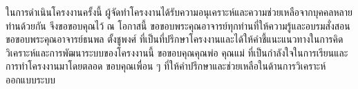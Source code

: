 
ในการดำเนินโครงงานครั้งนี้ ผู้จัดทำโครงงานได้รับความอนุเคราะห์และความช่วยเหลือจากบุคคลหลายท่านด้วยกัน จึงขอขอบคุณไว้ ณ โอกาสนี้ ขอขอบพระคุณอาจารย์ทุกท่านที่ให้ความรู้และอบรมสั่งสอน ขอขอบพระคุณอาจารย์ธนพล ตั้งชูพงศ์ ที่เป็นที่ปรึกษาโครงงานและได้ให้คำชี้แนะแนวทางในการคิดวิเคราะห์และการพัฒนาระบบของโครงงานนี้ ขอขอบคุณคุณพ่อ คุณแม่ ที่เป็นกำลังใจในการเรียนและการทำโครงงานมาโดยตลอด ขอบคุณเพื่อน ๆ ที่ให้คำปรึกษาและช่วยเหลือในด้านการวิเคราะห์ออกแบบระบบ
